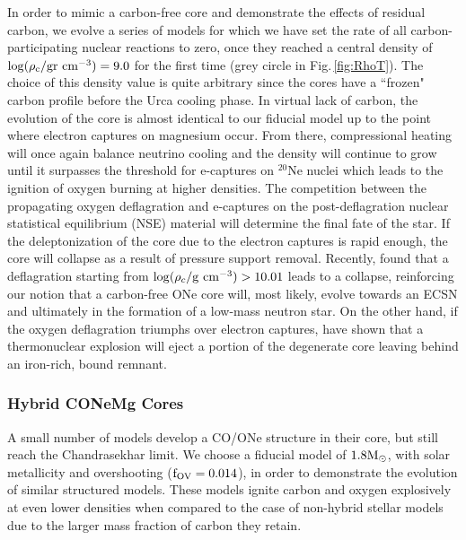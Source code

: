 \documentclass[../../main/thesis_msc.tex]{subfiles}
\begin{document}
        In order to mimic a carbon-free core and demonstrate the effects of residual carbon, we evolve a series of models for which we have set the rate of all carbon-participating nuclear reactions to zero, once they reached a central density of $\rm \log(\rho_c / \rm gr \ cm^{-3}) = 9.0$ for the first time (grey circle in Fig.\,\ref{fig:RhoT}). The choice of this density value is quite arbitrary since the cores have a ``frozen" carbon profile before the Urca cooling phase. In virtual lack of carbon, the evolution of the core is almost identical to our fiducial model up to the point where electron captures on magnesium occur. From there, compressional heating will once again balance neutrino cooling and the density will continue to grow until it surpasses the threshold for e-captures on $^{20}$Ne nuclei which leads to the ignition of oxygen burning at higher densities. The competition between the propagating oxygen deflagration and e-captures on the post-deflagration nuclear statistical equilibrium (NSE) material will determine the final fate of the star. If the deleptonization of the core due to the electron captures is rapid enough, the core will collapse as a result of pressure support removal. Recently, \cite{Zha2019} found that a deflagration starting from $\log(\rho_c / \rm g \ cm^{-3}) > 10.01$ leads to a collapse, reinforcing our notion that a carbon-free ONe core will, most likely, evolve towards an ECSN and ultimately in the formation of a low-mass neutron star. On the other hand, if the oxygen deflagration triumphs over electron captures, \cite{Jones2016} have shown that a thermonuclear explosion will eject a portion of the degenerate core leaving behind an iron-rich, bound remnant.
        
        
        \subsubsection{Hybrid CONeMg Cores}
    
        A small number of models develop a CO/ONe structure in their core, but still reach the Chandrasekhar limit. We choose a fiducial model of $1.8 \rm M_{\odot}$, with solar metallicity and overshooting ($\rm f_{\rm OV} = 0.014$), in order to demonstrate the evolution of similar structured models. 
        These models ignite carbon and oxygen explosively at even lower densities when compared to the case of non-hybrid stellar models due to the larger mass fraction of carbon they retain.
        
\end{document}
